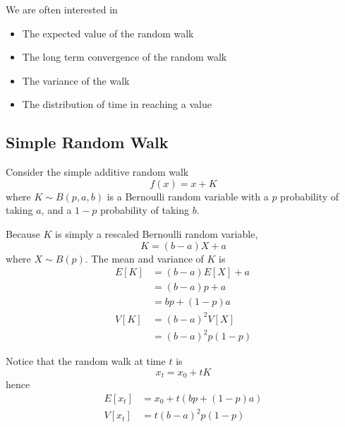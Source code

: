\documentclass[11pt]{article}
\begin{document}
We are often interested in
\begin{itemize}
    \item The expected value of the random walk
    \item The long term convergence of the random walk
    \item The variance of the walk
    \item The distribution of time in reaching a value
\end{itemize}

\subsection{Simple Random Walk}
Consider the simple additive random walk
\[
    f(x) = x + K
\]
where $K \sim B(p, a, b)$ is a Bernoulli random variable with a $p$ probability of taking $a$, and a $1-p$ probability of taking $b$.

Because $K$ is simply a rescaled Bernoulli random variable,
\[
    K = (b-a) X + a
\]
where $X \sim B(p)$. The mean and variance of $K$ is
\begin{align*}
    E[K] &= (b-a) E[X] + a\\
    &= (b-a) p + a\\
    &= bp + (1-p) a\\
    V[K] &= (b-a)^2 V[X]\\
    &= (b-a)^2 p(1-p)
\end{align*}

Notice that the random walk at time $t$ is
\[
    x_t = x_0 + t K
\]
hence
\begin{align*}
    E[x_t] &= x_0 + t (bp + (1-p)a)\\
    V[x_t] &= t (b-a)^2 p (1-p)
\end{align*}
\end{document}
